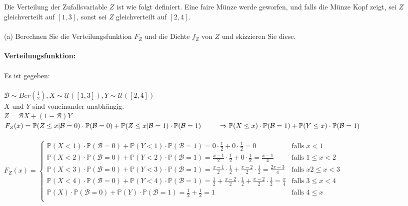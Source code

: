\documentclass[a4paper]{article}
\begin{document}
\subsection{}
Die Verteilung der Zufallsvariable $Z$ ist wie folgt definiert. Eine faire Münze werde geworfen, und falls die Münze Kopf zeigt, sei $Z$ gleichverteilt auf $[1,3]$, sonst sei $Z$ gleichverteilt auf $[2,4]$.\\\\
(a) Berechnen Sie die Verteilungsfunktion $F_Z$ und die Dichte $f_Z$ von $Z$ und skizzieren Sie diese.\\\\
\textbf{Verteilungsfunktion:}\\\\
Es ist gegeben:\\\\
\(\mathcal{B}\sim Ber\left(\frac{1}{2}\right), X\sim \mathcal{U}([1,3]), Y \sim \mathcal{U}([2,4])\)\\
$X$ und $Y$ sind voneinander unabhängig.\\
\(Z=\mathcal{B}X + (1-\mathcal{B})Y\)\\
\(F_Z(x)=\mathbb{P}(Z\leq x \vert \mathcal{B}=0)\cdot \mathbb{P}(\mathcal{B}=0)+\mathbb{P}(Z\leq x \vert \mathcal{B}=1)\cdot \mathbb{P}(\mathcal{B}=1)\\
\hspace*{.85cm}\Rightarrow\mathbb{P}(X\leq x)\cdot \mathbb{P}(\mathcal{B}=1) + \mathbb{P}(Y\leq x) \cdot \mathbb{P}(\mathcal{B}=1)\)\\\\
\(F_Z(x)= 
\begin{cases}
    \mathbb{P}(X<1)\cdot\mathbb{P}(\mathcal{B}=0)+\mathbb{P}(Y<1)\cdot \mathbb{P}(\mathcal{B}=1) = 0\cdot \frac{1}{2}+0\cdot \frac{1}{2}=0 & \text{falls } x<1\\
    \mathbb{P}(X<2)\cdot\mathbb{P}(\mathcal{B}=0)+\mathbb{P}(Y<2)\cdot \mathbb{P}(\mathcal{B}=1) = \frac{x-1}{2}\cdot \frac{1}{2}+0\cdot \frac{1}{2}=\frac{x-1}{4} & \text{falls } 1\leq x<2\\
    \mathbb{P}(X<3)\cdot\mathbb{P}(\mathcal{B}=0)+\mathbb{P}(Y<3)\cdot \mathbb{P}(\mathcal{B}=1) = \frac{x-1}{2}\cdot \frac{1}{2}+\frac{x-2}{2}\cdot \frac{1}{2}=\frac{2x-3}{4} & \text{falls } x2\leq x < 3\\
    \mathbb{P}(X<4)\cdot\mathbb{P}(\mathcal{B}=0)+\mathbb{P}(Y<4)\cdot \mathbb{P}(\mathcal{B}=1) = \frac{1}{2} + \frac{x-2}{2}\cdot \frac{1}{2}+ \frac{x-2}{2}\cdot \frac{1}{2}=\frac{x}{4} & \text{falls } 3\leq x < 4\\
    \mathbb{P}(X)\cdot\mathbb{P}(\mathcal{B}=0)+\mathbb{P}(Y)\cdot \mathbb{P}(\mathcal{B}=1) = \frac{1}{2}+ \frac{1}{2}=1 & \text{falls } 4 \leq x\\
\end{cases}\)\\\\\\
\end{document}
